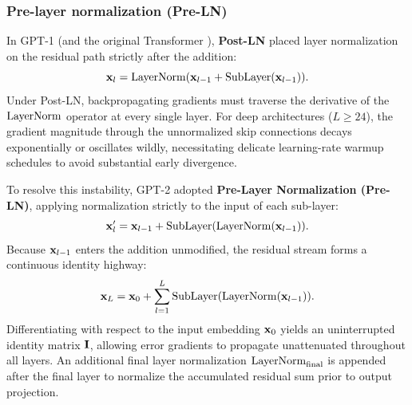 \documentclass[../../main.tex]{subfiles}
\begin{document}
\subsubsection{Pre-layer normalization (Pre-LN)}
In GPT-1 (and the original Transformer \cite{vaswani2017}), \textbf{Post-LN} placed layer normalization on the residual path strictly after the addition:
\begin{equation}
\label{eq:post_layer_norm}
\mathbf{x}_{l} = \operatorname{\mathrm{LayerNorm}}(\mathbf{x}_{l-1} + \text{SubLayer}(\mathbf{x}_{l-1})).
\end{equation}
Under Post-LN, backpropagating gradients must traverse the derivative of the $\operatorname{\mathrm{LayerNorm}}$ operator at every single layer. For deep architectures ($L \ge 24$), the gradient magnitude through the unnormalized skip connections decays exponentially or oscillates wildly, necessitating delicate learning-rate warmup schedules to avoid substantial early divergence.

To resolve this instability, GPT-2 adopted \textbf{Pre-Layer Normalization (Pre-LN)}, applying normalization strictly to the input of each sub-layer:
\begin{equation}
\label{eq:pre_layer_norm}
\mathbf{x}'_{l} = \mathbf{x}_{l-1} + \text{SubLayer}(\operatorname{\mathrm{LayerNorm}}(\mathbf{x}_{l-1})).
\end{equation}
Because $\mathbf{x}_{l-1}$ enters the addition unmodified, the residual stream forms a continuous identity highway:
\begin{equation}
\label{eq:pre_ln_identity_highway}
\mathbf{x}_L = \mathbf{x}_0 + \sum_{l=1}^L \text{SubLayer}(\operatorname{\mathrm{LayerNorm}}(\mathbf{x}_{l-1})).
\end{equation}
Differentiating with respect to the input embedding $\mathbf{x}_0$ yields an uninterrupted identity matrix $\mathbf{I}$, allowing error gradients to propagate unattenuated throughout all layers. An additional final layer normalization $\operatorname{\mathrm{LayerNorm}}_{\text{final}}$ is appended after the final layer to normalize the accumulated residual sum prior to output projection.
\end{document}
